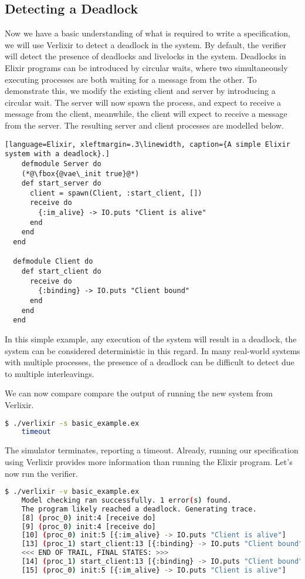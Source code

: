 \subsection{Detecting a Deadlock} \label{sec:deadlock}
Now we have a basic understanding of what is required to write a specification, we will use Verlixir to detect a deadlock in the system. By default, the verifier will detect the presence of deadlocks and livelocks in the system. Deadlocks in Elixir programs can be introduced by circular waits, where two simultaneously executing processes are both waiting for a message from the other. To demonstrate this, we modify the existing client and server by introducing a circular wait. The server will now spawn the process, and expect to receive a message from the client, meanwhile, the client will expect to receive a message from the server. The resulting server and client processes are modelled below.
\begin{lstlisting}[language=Elixir, xleftmargin=.3\linewidth, caption={A simple Elixir system with a deadlock}.]
    defmodule Server do
    (*@\fbox{@vae\_init true}@*)
    def start_server do
      client = spawn(Client, :start_client, [])
      receive do
        {:im_alive} -> IO.puts "Client is alive"
      end
    end
  end
  
  defmodule Client do
    def start_client do
      receive do
        {:binding} -> IO.puts "Client bound"
      end
    end
  end  
\end{lstlisting}
In this simple example, any execution of the system will result in a deadlock, the system can be considered deterministic in this regard. In many real-world systems with multiple processes, the presence of a deadlock can be difficult to detect due to multiple interleavings.
\par
We can now compare compare the output of running the new system from Verlixir.
\begin{lstlisting}[language=bash, xleftmargin=.3\linewidth]
    $ ./verlixir -s basic_example.ex
    timeout
\end{lstlisting}
The simulator terminates, reporting a timeout. Already, running our specification using Verlixir provides more information than running the Elixir program. Let's now run the verifier.
\begin{lstlisting}[language=bash, xleftmargin=.2\linewidth]
    $ ./verlixir -v basic_example.ex
    Model checking ran successfully. 1 error(s) found.
    The program likely reached a deadlock. Generating trace.
    [8] (proc_0) init:4 [receive do]
    [9] (proc_0) init:4 [receive do]
    [10] (proc_0) init:5 [{:im_alive} -> IO.puts "Client is alive"]
    [13] (proc_1) start_client:13 [{:binding} -> IO.puts "Client bound"]
    <<< END OF TRAIL, FINAL STATES: >>>
    [14] (proc_1) start_client:13 [{:binding} -> IO.puts "Client bound"]
    [15] (proc_0) init:5 [{:im_alive} -> IO.puts "Client is alive"]
\end{lstlisting}
